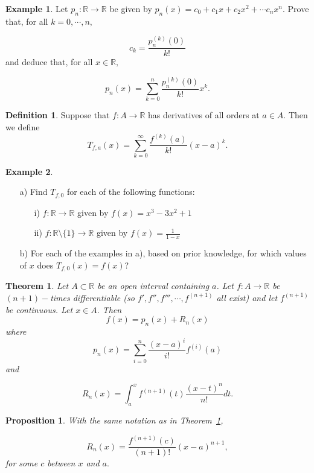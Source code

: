 \documentclass[openany, amssymb, psamsfonts]{amsart}
\newcommand{\bbR}{\mathbb{R}}
\newtheorem{thm}{Theorem}[section]
\newtheorem{prop}{Proposition}[section]
\theoremstyle{definition}
\newtheorem{defn}{Definition}[section]
\newtheorem{exmp}{Example}[section]
\numberwithin{equation}{section}
\begin{document}
\begin{exmp}
Let $p_n\colon\bbR\to\bbR$ be given by $p_n(x)=c_0+c_1 x+c_2x^2 +\cdots c_n x^n.$  Prove that, for all $k=0,\cdots, n,$

$$c_k = \frac{p_n^{(k) } (0)}{k!}$$ and deduce that, for all $x\in \bbR,$ 

$$p_n(x) = \sum_{k=0}^n \frac{p_n^{(k) } (0)}{k!}x^k.$$ 

\end{exmp}

\begin{defn} 
Suppose that $f:A\to\bbR$ has derivatives of all orders at $a\in A.$ 
Then we define $$T_{f,a}(x)= \sum_{k=0}^{\infty} \frac{f^{(k)} (a)}{k!} (x-a)^k.$$

\end{defn} 


\begin{exmp}\label{TSex}
\begin{enumerate}
\item[a)] Find $T_{f,0}$ for each of the following functions:
\begin{enumerate}
\item[i)] $f:\bbR\to\bbR$ given by $f(x)=x^3-3x^2+1$ 
\item[ii)] $f:\bbR\setminus\{1\}\to \bbR$ given by $f(x) = \frac{1}{1-x}$ 
\end{enumerate}
\item[b)] For each of the examples in a), based on prior knowledge, for which values of $x$ does $T_{f,0}(x)=f(x)$?  

\end{enumerate}
\end{exmp}




\begin{thm} \label{thm1}
Let $A\subset \bbR$ be an open interval containing $a$. Let $f\colon A\to\bbR$ be $(n+1)-$times differentiable (so $f',f'',f''',\cdots, f^{(n+1)}$ all exist) and let $f^{(n+1)}$ be continuous. Let $x\in A.$  Then
$$f(x)=p_n(x)+R_n(x) $$
where
$$p_n(x)=\sum_{i=0}^n \frac{(x-a)^i}{i!} f^{(i)} (a)$$
and

$$R_n(x)=\int_{a}^x f^{(n+1)}(t)\frac{(x-t)^n}{n!} dt.$$
\end{thm}


\begin{prop}\label{prop2}  With the same notation as in Theorem~\ref{thm1},

$$R_n(x) = \frac{f^{(n+1)} (c)}{(n+1)!} (x-a)^{n+1},$$
for some $c$ between $x$ and $a.$
\end{prop}
\end{document}

